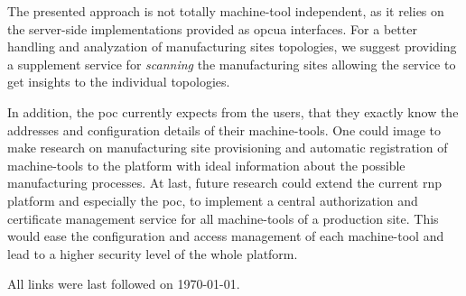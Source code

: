 \documentclass[
a4paper,
twoside,
headsepline,
cleardoublepage=empty,
parskip=half,
draft=false
]{scrbook}
\begin{document}
			The presented approach is not totally machine-tool independent, as it relies on the server-side implementations provided as \gls{opcua} interfaces. For a better handling and analyzation of manufacturing sites topologies, we suggest providing a supplement service for \textit{scanning} the manufacturing sites allowing the service to get insights to the individual topologies.

			In addition, the \gls{poc} currently expects from the users, that they exactly know the addresses and configuration details of their machine-tools. One could image to make research on manufacturing site provisioning and automatic registration of machine-tools to the platform with ideal information about the possible manufacturing processes.
			At last, future research could extend the current \gls{rnp} platform and especially the \gls{poc}, to implement a central authorization and certificate management service for all machine-tools of a production site. This would ease the configuration and access management of each machine-tool and lead to a higher security level of the whole platform.

	\clearpage


	\printbibliography

	All links were last followed on \today.

	\pagestyle{empty}
	\renewcommand*{\chapterpagestyle}{empty}
	\Versicherung
\end{document}
